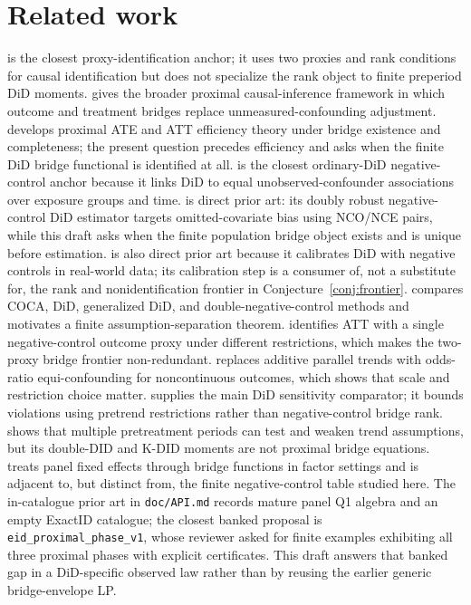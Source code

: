 \documentclass[11pt]{article}
\theoremstyle{definition}
\theoremstyle{plain}
\theoremstyle{remark}
\begin{document}
\section{Related work}
\citet[\S3.2, pp. 1157--1160]{MiaoGengTchetgen2018ProxyVariables} is the closest proxy-identification anchor; it uses two proxies and rank conditions for causal identification but does not specialize the rank object to finite preperiod DiD moments.  \citet[\S2--\S3]{TchetgenTchetgenYingCuiShiMiao2024Proximal} gives the broader proximal causal-inference framework in which outcome and treatment bridges replace unmeasured-confounding adjustment.  \citet[\S3--\S4]{CuiPuShiMiaoTchetgen2024JASA} develops proximal ATE and ATT efficiency theory under bridge existence and completeness; the present question precedes efficiency and asks when the finite DiD bridge functional is identified at all.  \citet[\S3, pp. 12--15]{SoferRichardsonColicinoSchwartzTchetgen2016NOC} is the closest ordinary-DiD negative-control anchor because it links DiD to equal unobserved-confounder associations over exposure groups and time.  \citet{Gregori2025DIDNegativeControls} is direct prior art: its doubly robust negative-control DiD estimator targets omitted-covariate bias using NCO/NCE pairs, while this draft asks when the finite population bridge object exists and is unique before estimation.  \citet{ZhangEtAl2025NCCDiD} is also direct prior art because it calibrates DiD with negative controls in real-world data; its calibration step is a consumer of, not a substitute for, the rank and nonidentification frontier in Conjecture~\ref{conj:frontier}.  \citet{PenningDeVriesGroenwold2023NegativeControls} compares COCA, DiD, generalized DiD, and double-negative-control methods and motivates a finite assumption-separation theorem.  \citet[\S2--\S3]{ParkRichardsonTchetgen2024SingleProxy} identifies ATT with a single negative-control outcome proxy under different restrictions, which makes the two-proxy bridge frontier non-redundant.  \citet{TchetgenParkRichardson2024UniversalDID} replaces additive parallel trends with odds-ratio equi-confounding for noncontinuous outcomes, which shows that scale and restriction choice matter.  \citet{RambachanRoth2023ParallelTrends} supplies the main DiD sensitivity comparator; it bounds violations using pretrend restrictions rather than negative-control bridge rank.  \citet{EgamiYamauchi2023MultiplePretreatmentDID} shows that multiple pretreatment periods can test and weaken trend assumptions, but its double-DID and K-DID moments are not proximal bridge equations.  \citet{ImbensKallusMao2021MinimalBridgePanel} treats panel fixed effects through bridge functions in factor settings and is adjacent to, but distinct from, the finite negative-control table studied here.  The in-catalogue prior art in \texttt{doc/API.md} records mature panel Q1 algebra and an empty ExactID catalogue; the closest banked proposal is \texttt{eid\_proximal\_phase\_v1}, whose reviewer asked for finite examples exhibiting all three proximal phases with explicit certificates.  This draft answers that banked gap in a DiD-specific observed law rather than by reusing the earlier generic bridge-envelope LP.
\end{document}
